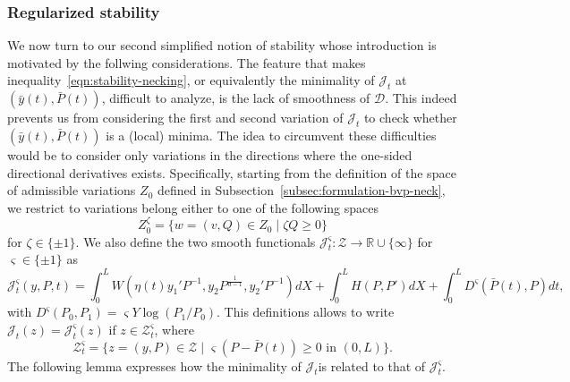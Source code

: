 \documentclass[a4paper,10pt,oneside]{amsbook}
\numberwithin{section}{chapter}
\numberwithin{equation}{chapter}
\theoremstyle{definition}
\begin{document}
\subsubsection*{Regularized stability}

We now turn to our second simplified notion of stability whose introduction is motivated by the follwing considerations. The feature that makes inequality~\eqref{eqn:stability-necking}, or equivalently the minimality of $\mathcal{J}_t$ at $(\bar{y}(t),\bar{P}(t))$, difficult to analyze, is the lack of smoothness of $\mathcal{D}$. This indeed prevents us from considering the first and second variation of $\mathcal{J}_t$ to check whether $(\bar{y}(t),\bar{P}(t))$ is a (local) minima. The idea to circumvent these difficulties would be to consider only variations in the directions where the one-sided directional derivatives exists. Specifically, starting from the definition of the space of admissible variations $Z_0$ defined in Subsection~\ref{subsec:formulation-bvp-neck}, we restrict to variations belong either to one of the following spaces
\[
Z_0^\zeta=\{w=(v,Q)\in Z_0\;|\;\zeta Q\ge0\}
\]
for $\zeta\in\{\pm1\}$. We also define the two smooth functionals $\mathcal{J}_t^\varsigma\colon\mathscr{Z}\to\mathbb{R}\cup\{\infty\}$ for $\varsigma\in\{\pm1\}$ as
\[
\mathcal{J}_t^\varsigma(y,P,t)=\int_0^LW(\eta(t)y_1'P^{-1},y_2P^\frac{1}{d-1},y_2'P^{-1})dX+\int_0^LH(P,P')dX+\int_0^LD^\varsigma(\bar P(t),P)dt,
\]
with $D^\varsigma(P_0,P_1)=\varsigma Y\log(P_1/P_0)$. This definitions allows to write $\mathcal{J}_t(z)=\mathcal{J}_t^\varsigma(z)$ if $z\in\mathscr{Z}^\varsigma_t$, where
\[
\mathscr{Z}^\varsigma_t=\{z=(y,P)\in\mathscr{Z}\;|\;\text{$\varsigma(P-\bar P(t))\ge0$ in $(0,L)$}\}.
\]
The following lemma expresses how the minimality of $\mathcal{J}_t$is related to that of $\mathcal{J}_t^\varsigma$.
\end{document}
